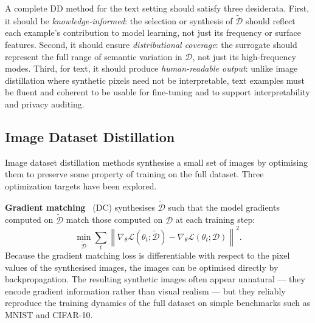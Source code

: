 \begin{foldable}
  A complete DD method for the text setting should satisfy three desiderata.
  First, it should be \emph{knowledge-informed}: the selection or synthesis of $\tilde{\mathcal{D}}$ should reflect each example's contribution to model learning, not just its frequency or surface features.
  Second, it should ensure \emph{distributional coverage}: the surrogate should represent the full range of semantic variation in $\mathcal{D}$, not just its high-frequency modes.
  Third, for text, it should produce \emph{human-readable output}: unlike image distillation where synthetic pixels need not be interpretable, text examples must be fluent and coherent to be usable for fine-tuning and to support interpretability and privacy auditing.
\end{foldable}

\subsection{Image Dataset Distillation}
\label{sec:26-background-datasetdistillation-image}

\begin{foldable}
  Image dataset distillation methods synthesise a small set of images by optimising them to
  preserve some property of training on the full dataset.
  Three optimization targets have been explored.
\end{foldable}

\begin{foldable}
  \textbf{Gradient matching}~\cite{zhao2020dataset} (DC) synthesises $\tilde{\mathcal{D}}$ such that the model gradients computed on $\tilde{\mathcal{D}}$ match those computed on $\mathcal{D}$ at each training step:
  \begin{equation}
    \min_{\tilde{\mathcal{D}}} \sum_{t} \left\| \nabla_\theta \mathcal{L}(\theta_t;
    \tilde{\mathcal{D}}) - \nabla_\theta \mathcal{L}(\theta_t; \mathcal{D}) \right\|^2.
    \label{eq:dc-objective}
  \end{equation}
  Because the gradient matching loss is differentiable with respect to the pixel values of the synthesised images, the images can be optimised directly by backpropagation.
  The resulting synthetic images often appear unnatural --- they encode gradient information rather than visual realism --- but they reliably reproduce the training dynamics of the full dataset on simple benchmarks such as MNIST and CIFAR-10.
\end{foldable}

